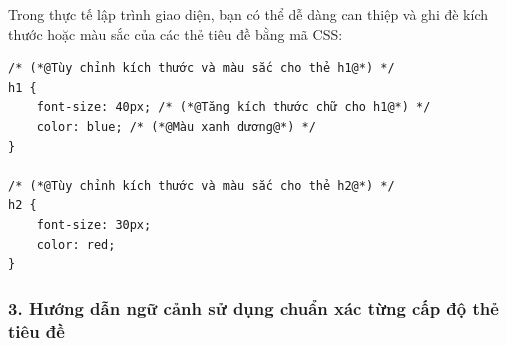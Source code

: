 \documentclass[11pt,oneside]{book}
\newcommand{\thd}[1]{\textcolor{white}{\textbf{\strut #1}}}
\newcommand{\codeinline}[1]{\textcolor{accentOrange}{\texttt{#1}}}
\begin{document}
\begin{prettyTableBox}
\end{prettyTableBox}

Trong thực tế lập trình giao diện, bạn có thể dễ dàng can thiệp và ghi đè kích thước hoặc màu sắc của các thẻ tiêu đề bằng mã CSS:

\begin{codeWindow}
\begin{lstlisting}[language=HTML5]
/* (*@Tùy chỉnh kích thước và màu sắc cho thẻ h1@*) */
h1 {
    font-size: 40px; /* (*@Tăng kích thước chữ cho h1@*) */
    color: blue; /* (*@Màu xanh dương@*) */
}

/* (*@Tùy chỉnh kích thước và màu sắc cho thẻ h2@*) */
h2 {
    font-size: 30px;
    color: red;
}
\end{lstlisting}
\end{codeWindow}

\subsubsection{3. Hướng dẫn ngữ cảnh sử dụng chuẩn xác từng cấp độ thẻ tiêu đề}
\end{document}

